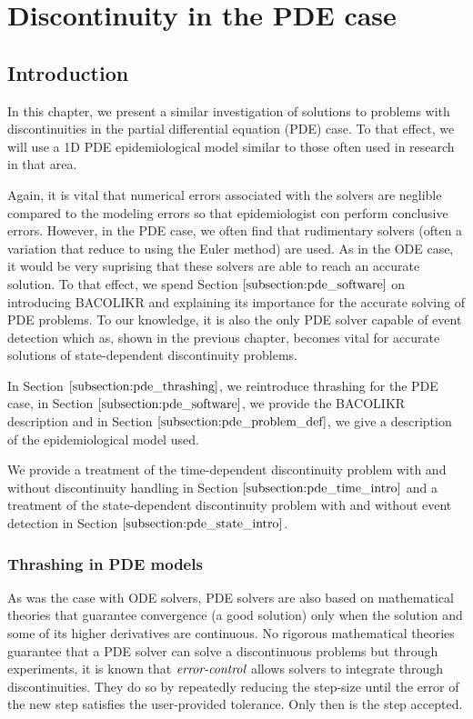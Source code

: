 \documentclass{article}
\begin{document}
\section{Discontinuity in the PDE case}
\subsection{Introduction}
\label{subsection:pde_intro}
In this chapter, we present a similar investigation of solutions to problems with discontinuities in the partial differential equation (PDE) case. To that effect, we will use a 1D PDE epidemiological model similar to those often used in research in that area. 

Again, it is vital that numerical errors associated with the solvers are neglible compared to the modeling errors so that epidemiologist con perform conclusive errors. However, in the PDE case, we often find that rudimentary solvers (often a variation that reduce to using the Euler method) are used. As in the ODE case, it would be very suprising that these solvers are able to reach an accurate solution. To that effect, we spend Section $\ref{subsection:pde_software}$ on introducing BACOLIKR and explaining its importance for the accurate solving of PDE problems. To our knowledge, it is also the only PDE solver capable of event detection which as, shown in the previous chapter, becomes vital for accurate solutions of state-dependent discontinuity problems.

In Section $\ref{subsection:pde_thrashing}$, we reintroduce thrashing for the PDE case, in Section $\ref{subsection:pde_software}$, we provide the BACOLIKR description and in Section $\ref{subsection:pde_problem_def}$, we give a description of the epidemiological model used.

We provide a treatment of the time-dependent discontinuity problem with and without discontinuity handling in Section $\ref{subsection:pde_time_intro}$ and a treatment of the state-dependent discontinuity problem with and without event detection in Section $\ref{subsection:pde_state_intro}$.

\subsubsection{Thrashing in PDE models}
\label{subsection:pde_thrashing}
As was the case with ODE solvers, PDE solvers are also based on mathematical theories that guarantee convergence (a good solution) only when the solution and some of its higher derivatives are continuous. No rigorous mathematical theories guarantee that a PDE solver can solve a discontinuous problems but through experiments, it is known that $\emph{error-control}$ allows solvers to integrate through discontinuities. They do so by repeatedly reducing the step-size until the error of the new step satisfies the user-provided tolerance. Only then is the step accepted.
\end{document}
